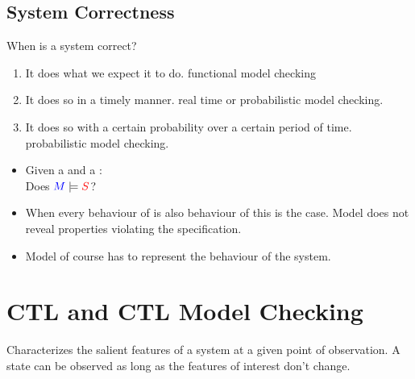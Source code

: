 \documentclass[a4paper, 10pt]{article}
\begin{document}
\subsection{System Correctness}
When is a system correct?
\begin{enumerate}
    \item It does what we expect it to do. \follows functional model checking
    \item It does so in a timely manner. \follows real time or probabilistic model checking.
    \item It does so with a certain probability over a certain period of time. \follows probabilistic model checking.
\end{enumerate}

\begin{minipage}[t]{3cm}
\begin{center}
\scalebox{1}{}
\end{center}
\end{minipage}
\begin{minipage}[t]{12cm}
\begin{itemize}
    \item Given a  and a : \\ Does $\textcolor{blue}{M}\models\textcolor{red}{S}$?
    \item When every behaviour of  is also behaviour of  this is the case. \follows Model does not reveal properties violating the specification.
    \item Model of course has to represent the behaviour of the system.
\end{itemize}
\end{minipage}

\section{CTL and CTL Model Checking}
\begin{mdframed}[roundcorner=5pt,
subtitlebelowline=false,subtitleaboveline=false,
subtitlebackgroundcolor=blue!30,
frametitlerule=true,
frametitlebackgroundcolor=blue!30,
frametitle={State}
]
Characterizes the salient features of a system at a given point of observation. \follows A state can be observed as long as the features of interest don't change.
\end{mdframed}
\end{document}
